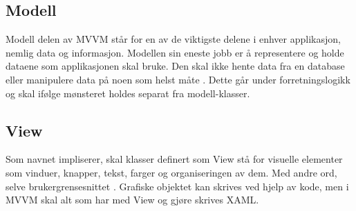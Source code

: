 \subsection{Modell}

Modell delen av MVVM står for en av de viktigste delene i enhver applikasjon, nemlig data og informasjon. Modellen sin eneste jobb er å representere og holde dataene som applikasjonen skal bruke. Den skal ikke hente data fra en database eller manipulere data på noen som helst måte \cite{Model7:online}. Dette går under forretningslogikk og skal ifølge mønsteret holdes separat fra modell-klasser. 


\subsection{View}
 
 Som navnet impliserer, skal klasser definert som View stå for visuelle elementer som vinduer, knapper, tekst, farger og organiseringen av dem. Med andre ord, selve brukergrensesnittet \cite{THEM6:online}. Grafiske objektet kan skrives ved hjelp av kode, men i MVVM skal alt som har med View og gjøre skrives XAML.
 
 

 
 

